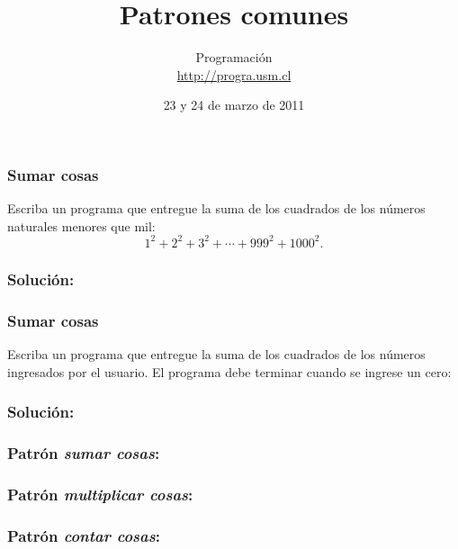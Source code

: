 \documentclass[12pt]{beamer}
\title{Patrones comunes}
\author{
  Programación \\ \url{http://progra.usm.cl}
}
\date{23 y 24 de marzo de 2011}
\begin{document}
  \begin{frame}
    \maketitle
  \end{frame}

  \begin{frame}
    \frametitle{Sumar cosas}
    Escriba un programa que entregue la suma
    de los cuadrados de los números naturales
    menores que mil:
    \[
      1^2 + 2^2 + 3^2 + \cdots + 999^2 + 1000^2.
    \]
  \end{frame}

  \begin{frame}
    \frametitle{Solución:}
    
  \end{frame}

  \begin{frame}
    \frametitle{Sumar cosas}
    Escriba un programa que entregue la suma
    de los cuadrados de los números ingresados por el usuario.
    El programa debe terminar
    cuando se ingrese un cero:
    
  \end{frame}

  \begin{frame}
    \frametitle{Solución:}
    
  \end{frame}

  \begin{frame}
    \frametitle{Patrón \emph{sumar cosas}:}
    
  \end{frame}

  \begin{frame}
    \frametitle{Patrón \emph{multiplicar cosas}:}
    
  \end{frame}

  \begin{frame}
    \frametitle{Patrón \emph{contar cosas}:}
    
  \end{frame}
\end{document}
